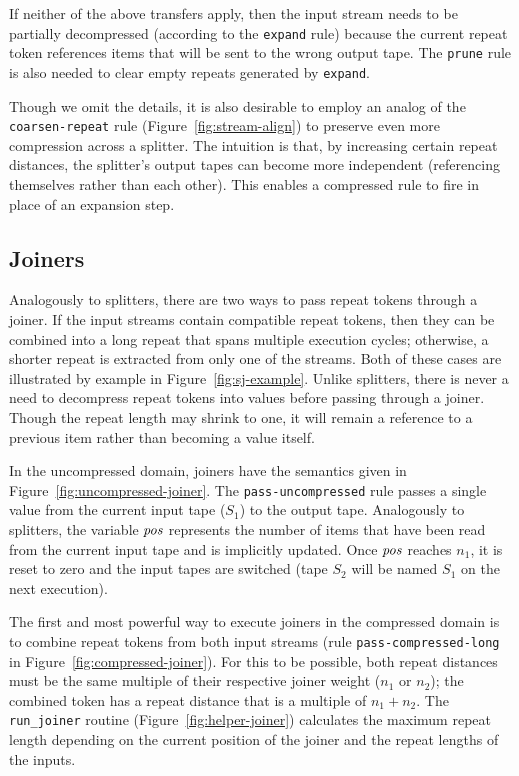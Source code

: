 If neither of the above transfers apply, then the input stream needs
to be partially decompressed (according to the {\tt expand} rule)
because the current repeat token references items that will be sent to
the wrong output tape.  The {\tt prune} rule is also needed to clear
empty repeats generated by {\tt expand}.

Though we omit the details, it is also desirable to employ an analog
of the {\tt coarsen-repeat} rule (Figure~\ref{fig:stream-align}) to
preserve even more compression across a splitter.  The intuition is
that, by increasing certain repeat distances, the splitter's output
tapes can become more independent (referencing themselves rather than
each other).  This enables a compressed rule to fire in place of an
expansion step.

\subsection{Joiners}

Analogously to splitters, there are two ways to pass repeat tokens
through a joiner.  If the input streams contain compatible repeat
tokens, then they can be combined into a long repeat that spans
multiple execution cycles; otherwise, a shorter repeat is extracted
from only one of the streams.  Both of these cases are illustrated by
example in Figure~\ref{fig:sj-example}.  Unlike splitters, there is
never a need to decompress repeat tokens into values before passing
through a joiner.  Though the repeat length may shrink to one, it will
remain a reference to a previous item rather than becoming a value
itself.

In the uncompressed domain, joiners have the semantics given in
Figure~\ref{fig:uncompressed-joiner}.  The {\tt pass-uncompressed}
rule passes a single value from the current input tape ($S_1$) to the
output tape.  Analogously to splitters, the variable $\mbox{\it pos}$ represents
the number of items that have been read from the current input tape
and is implicitly updated.  Once $\mbox{\it pos}$ reaches $n_1$, it is reset to
zero and the input tapes are switched (tape $S_2$ will be named $S_1$
on the next execution).

The first and most powerful way to execute joiners in the compressed
domain is to combine repeat tokens from both input streams
%
\clearpage\noindent\clearpage\noindent %
%
(rule {\tt pass-compressed-long} in
Figure~\ref{fig:compressed-joiner}).  For this to be possible, both
repeat distances must be the same multiple of their respective joiner
weight ($n_1$ or $n_2$); the combined token has a repeat distance that
is a multiple of $n_1 + n_2$.  The {\tt run\_joiner} routine
(Figure~\ref{fig:helper-joiner}) calculates the maximum repeat length
depending on the current position of the joiner and the repeat lengths
of the inputs.

